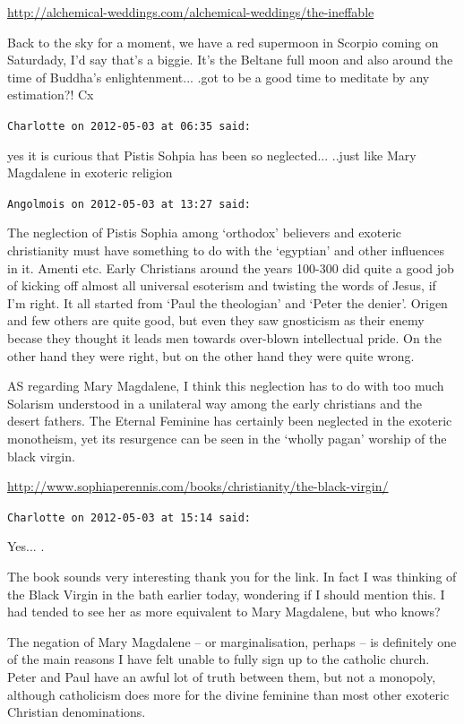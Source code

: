 \begin{footnotesize}
\begin{sffamily}
\url{http://alchemical-weddings.com/alchemical-weddings/the-ineffable}


Back to the sky for a moment, we have a red supermoon in Scorpio coming on Saturdady, I'd say that's a biggie. It's the Beltane full moon and also around the time of Buddha's enlightenment... .got to be a good time to meditate by any estimation?! Cx

\hfill

\texttt{Charlotte on 2012-05-03 at 06:35 said:}

yes it is curious that Pistis Sohpia has been so neglected... ..just like Mary Magdalene in exoteric religion

\hfill

\texttt{Angolmois on 2012-05-03 at 13:27 said:}

The neglection of Pistis Sophia among `orthodox' believers and exoteric christianity must have something to do with the `egyptian' and other influences in it. Amenti etc. Early Christians around the years 100-300 did quite a good job of kicking off almost all universal esoterism and twisting the words of Jesus, if I'm right. It all started from `Paul the theologian' and `Peter the denier'. Origen and few others are quite good, but even they saw gnosticism as their enemy becase they thought it leads men towards over-blown intellectual pride. On the other hand they were right, but on the other hand they were quite wrong.

AS regarding Mary Magdalene, I think this neglection has to do with too much Solarism understood in a unilateral way among the early christians and the desert fathers. The Eternal Feminine has certainly been neglected in the exoteric monotheism, yet its resurgence can be seen in the `wholly pagan' worship of the black virgin.

\url{http://www.sophiaperennis.com/books/christianity/the-black-virgin/}


\hfill

\texttt{Charlotte on 2012-05-03 at 15:14 said:}

Yes... .

The book sounds very interesting thank you for the link. In fact I was thinking of the Black Virgin in the bath earlier today, wondering if I should mention this. I had tended to see her as more equivalent to Mary Magdalene, but who knows?

The negation of Mary Magdalene -- or marginalisation, perhaps -- is definitely one of the main reasons I have felt unable to fully sign up to the catholic church. Peter and Paul have an awful lot of truth between them, but not a monopoly, although catholicism does more for the divine feminine than most other exoteric Christian denominations.


\end{sffamily}
\end{footnotesize}
